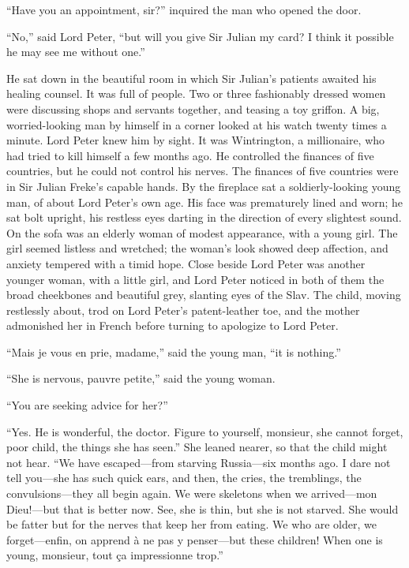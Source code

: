 \enquote{Have you an appointment, sir?} inquired the man who opened the door.

\enquote{No,} said Lord Peter, \enquote{but will you give Sir Julian my card? I think it possible he may see me without one.}

He sat down in the beautiful room in which Sir Julian’s patients awaited his healing counsel. It was full of people. Two or three fashionably dressed women were discussing shops and servants together, and teasing a toy griffon. A big, worried-looking man by himself in a corner looked at his watch twenty times a minute. Lord Peter knew him by sight. It was Wintrington, a millionaire, who had tried to kill himself a few months ago. He controlled the finances of five countries, but he could not control his nerves. The finances of five countries were in Sir Julian Freke’s capable hands. By the fireplace sat a soldierly-looking young man, of about Lord Peter’s own age. His face was prematurely lined and worn; he sat bolt upright, his restless eyes darting in the direction of every slightest sound. On the sofa was an elderly woman of modest appearance, with a young girl. The girl seemed listless and wretched; the woman’s look showed deep affection, and anxiety tempered with a timid hope. Close beside Lord Peter was another younger woman, with a little girl, and Lord Peter noticed in both of them the broad cheekbones and beautiful grey, slanting eyes of the Slav. The child, moving restlessly about, trod on Lord Peter’s patent-leather toe, and the mother admonished her in French before turning to apologize to Lord Peter.

\enquote{Mais je vous en prie, madame,} said the young man, \enquote{it is nothing.}

\enquote{She is nervous, pauvre petite,} said the young woman.

\enquote{You are seeking advice for her?}

\enquote{Yes. He is wonderful, the doctor. Figure to yourself, monsieur, she cannot forget, poor child, the things she has seen.} She leaned nearer, so that the child might not hear. \enquote{We have escaped\allowbreak---\allowbreak from starving Russia\allowbreak---\allowbreak six months ago. I dare not tell you\allowbreak---\allowbreak she has such quick ears, and then, the cries, the tremblings, the convulsions\allowbreak---\allowbreak they all begin again. We were skeletons when we arrived\allowbreak---\allowbreak mon Dieu!---but that is better now. See, she is thin, but she is not starved. She would be fatter but for the nerves that keep her from eating. We who are older, we forget\allowbreak---\allowbreak enfin, on apprend à ne pas y penser\allowbreak---\allowbreak but these children! When one is young, monsieur, tout ça impressionne trop.}

